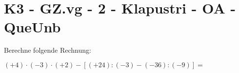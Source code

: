 \section{K3 - GZ.vg - 2 - Klapustri - OA - QueUnb}

\begin{beispiel}{0} %
				Berechne folgende Rechnung:
				
				\begin{center}
				$(+4)\cdot(-3)\cdot(+2)-[(+24):(-3)-(-36):(-9)]=$
				\end{center}
				
\end{beispiel}